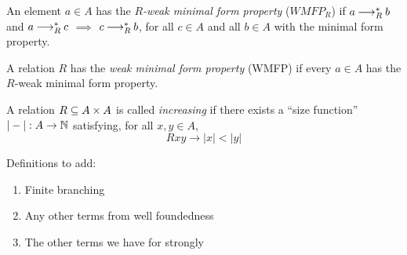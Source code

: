 \begin{definition}
   An element $a \in A$ has the \emph{${R}$-weak minimal form property} ($WMFP_R$) if
   $a \mathbin{\longrightarrow_R^*} b$ and $a \mathbin{\longrightarrow_R^*} c$  $\implies$
   $c \mathbin{\longrightarrow_R^*} b$, for all $c \in A$ and all $b \in A$ with the minimal form property.

   A relation $R$ has the \emph{weak minimal form property} (WMFP) if every $a \in A$ has the $R$-weak minimal form property.
\end{definition}
\begin{definition}
    \label{d:inc}
    A relation $R \subseteq A \times A$ is called \emph{increasing} if there
    exists a ``size function'' $|-| : A \to \mathbb{N}$ satisfying, for all $x, y \in A$,
    \[ Rxy \to |x| < |y| \]
\end{definition}

Definitions to add:
\begin{enumerate}
    \item Finite branching
    \item Any other terms from well foundedness
    \item The other terms we have for strongly
\end{enumerate}

